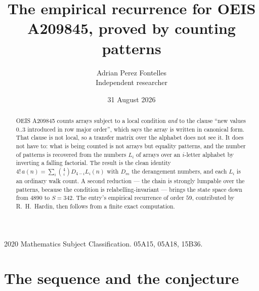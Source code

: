 \documentclass[11pt,a4paper]{article}
\title{The empirical recurrence for OEIS A209845, proved by counting patterns}
\author{Adrian Perez Fontelles\\ \small Independent researcher}
\date{31 August 2026}
\theoremstyle{plain}
\theoremstyle{definition}
\begin{document}
\maketitle

\begin{abstract}
OEIS A209845 counts arrays subject to a local condition \emph{and} to the clause ``new values
$0..3$ introduced in row major order'', which says the array is written in canonical
form. That clause is not local, so a transfer matrix over the alphabet does not see it. It
does not have to: what is being counted is not arrays but equality patterns, and the number
of patterns is recovered from the numbers $L_i$ of arrays over an $i$-letter alphabet by
inverting a falling factorial. The result is the clean identity
$4!\,a(n)=\sum_i\binom{4}{i}D_{4-i}L_i(n)$ with $D_m$ the derangement numbers,
and each $L_i$ is an ordinary walk count. A second reduction --- the chain is strongly
lumpable over the patterns, because the condition is relabelling-invariant --- brings the
state space down from $4890$ to $S=342$. The entry's empirical recurrence of order
$59$, contributed by R.~H.~Hardin, then follows from a finite exact computation.
\end{abstract}

\noindent\small 2020 Mathematics Subject Classification. 05A15, 05A18, 15B36.\normalsize

\section{The sequence and the conjecture}
\end{document}

